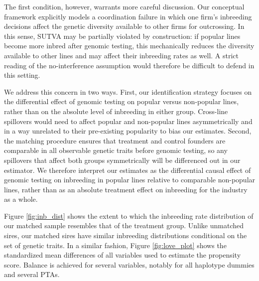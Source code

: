 \documentclass[12pt,letterpaper]{article}
\begin{document}
The first condition, however, warrants more careful discussion. Our conceptual framework explicitly models a coordination failure in which one firm's inbreeding decisions affect the genetic diversity available to other firms for outcrossing. In this sense, SUTVA may be partially violated by construction: if popular lines become more inbred after genomic testing, this mechanically reduces the diversity available to other lines and may affect their inbreeding rates as well. A strict reading of the no-interference assumption would therefore be difficult to defend in this setting.

We address this concern in two ways. First, our identification strategy focuses on the differential effect of genomic testing on popular versus non-popular lines, rather than on the absolute level of inbreeding in either group. Cross-line spillovers would need to affect popular and non-popular lines asymmetrically and in a way unrelated to their pre-existing popularity to bias our estimates. Second, the matching procedure ensures that treatment and control founders are comparable in all observable genetic traits before genomic testing, so any spillovers that affect both groups symmetrically will be differenced out in our estimator. We therefore interpret our estimates as the differential causal effect of genomic testing on inbreeding in popular lines relative to comparable non-popular lines, rather than as an absolute treatment effect on inbreeding for the industry as a whole.

Figure \ref{fig:inb_dist} shows the extent to which the inbreeding rate distribution of our matched sample resembles that of the treatment group. Unlike unmatched sires, our matched sires have similar inbreeding distributions conditional on the set of genetic traits. In a similar fashion, Figure \ref{fig:love_plot} shows the standardized mean differences of all variables used to estimate the propensity score. Balance is achieved for several variables, notably for all haplotype dummies and several PTAs.

\end{document}
